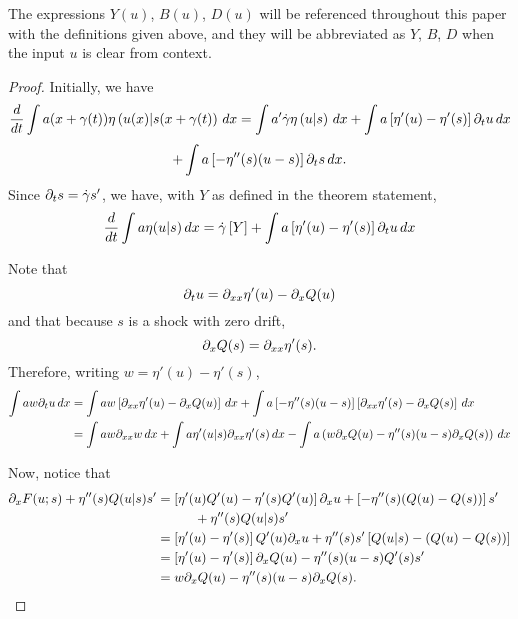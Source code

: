 The expressions $Y(u)$, $B(u)$, $D(u)$ will be referenced throughout this paper with the definitions given above, and they will be abbreviated as $Y$, $B$, $D$ when the input $u$ is clear from context.  

\begin{proof}
Initially, we have
\[ \frac{d}{dt} \int a(x+\gamma(t)) \eta\left(u(x)|s(x+\gamma(t)\right) \,dx = \int a'\dot{\gamma} \eta\left(u|s\right) \,dx + \int a \left[ \eta'(u) - \eta'(s) \right] \partial_t u \,dx \]
\[ + \int a \left[ -\eta''(s) (u-s) \right] \partial_t s \,dx. \]
Since $\partial_t s = \dot{\gamma} s'$, we have, with $Y$ as defined in the theorem statement, 
\begin{equation} \label{time deriv with Y}
\frac{d}{dt} \int a \eta(u|s) \,dx = \dot{\gamma} \left[ Y \right] + \int a \left[ \eta'(u) - \eta'(s) \right] \partial_t u \,dx 
\end{equation}

Note that
\[ \partial_t u = \partial_{xx} \eta'(u) - \partial_x Q(u) \]
and that because $s$ is a shock with zero drift,
\[ \partial_x Q(s) = \partial_{xx} \eta'(s). \]
Therefore, writing $w = \eta'(u)-\eta'(s)$, 
\begin{equation}\begin{aligned} \label{expansion of deltu term}
\int a w \partial_t u \,dx &= \int a w \left[  \partial_{xx} \eta'(u) - \partial_x Q(u)  \right] \,dx + \int a \left[  -\eta''(s) (u-s)  \right] \left[ \partial_{xx} \eta'(s) - \partial_x Q(s) \right] \,dx
\\ &= \int a w \partial_{xx} w \,dx + \int a \eta'(u|s) \partial_{xx} \eta'(s) \,dx - \int a \left( w \partial_x Q(u) - \eta''(s) (u-s) \partial_x Q(s) \right) \,dx
\end{aligned}\end{equation}

Now, notice that
\begin{equation}\begin{aligned} \label{F term explanation}
\partial_x F(u;s) + \eta''(s)Q(u|s)s' &= \left[  \eta'(u) Q'(u) - \eta'(s)Q'(u)  \right] \partial_x u + \left[  -\eta''(s)(Q(u)-Q(s))  \right] s' \\ & \hspace{1cm} + \eta''(s) Q(u|s) s'
\\ &= \left[  \eta'(u) - \eta'(s)  \right] Q'(u) \partial_x u + \eta''(s)s' \left[  Q(u|s) - \left( Q(u)-Q(s) \right)  \right]
\\ &= \left[  \eta'(u) - \eta'(s)  \right] \partial_x Q(u) - \eta''(s) (u-s) Q'(s) s'
\\ &= w \partial_x Q(u) - \eta''(s) (u-s) \partial_x Q(s).
\end{aligned}\end{equation}


\end{proof}
